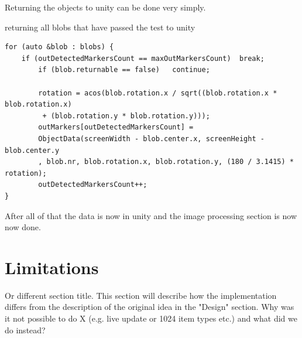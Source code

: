 Returning the objects to unity can be done very simply. 
 \begin{listing}[H]
	\caption{returning all blobs that have passed the test to unity}
	\begin{verbatim}
for (auto &blob : blobs) {
	if (outDetectedMarkersCount == maxOutMarkersCount)	break;
		if (blob.returnable == false)	continue;
		
		rotation = acos(blob.rotation.x / sqrt((blob.rotation.x * blob.rotation.x)
		 + (blob.rotation.y * blob.rotation.y)));
		outMarkers[outDetectedMarkersCount] = 
		ObjectData(screenWidth - blob.center.x, screenHeight - blob.center.y
		, blob.nr, blob.rotation.x, blob.rotation.y, (180 / 3.1415) * rotation);
		outDetectedMarkersCount++;
}
	\end{verbatim}
	\label{listing:return}
\end{listing}
After all of that the data is now in unity and the image processing section is now now done.
\section{Limitations}
Or different section title. This section will describe how the implementation differs from the description of the original idea in the "Design" section. Why was it not possible to do X (e.g. live update or 1024 item types etc.) and what did we do instead?